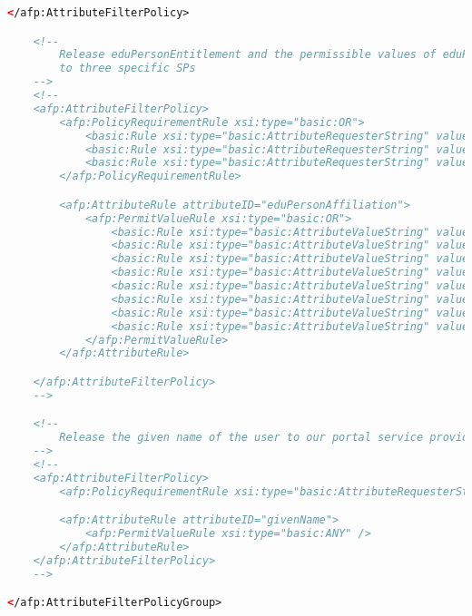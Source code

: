 \begin{lstlisting}[language=xml]
    </afp:AttributeFilterPolicy>

    <!--
        Release eduPersonEntitlement and the permissible values of eduPersonAffiliation
        to three specific SPs
    -->
    <!--
    <afp:AttributeFilterPolicy>
        <afp:PolicyRequirementRule xsi:type="basic:OR">
            <basic:Rule xsi:type="basic:AttributeRequesterString" value="urn:example.org:sp:Portal" />
            <basic:Rule xsi:type="basic:AttributeRequesterString" value="urn:example.org:sp:SIS" />
            <basic:Rule xsi:type="basic:AttributeRequesterString" value="urn:example.org:sp:LMS" />
        </afp:PolicyRequirementRule>

        <afp:AttributeRule attributeID="eduPersonAffiliation">
            <afp:PermitValueRule xsi:type="basic:OR">
                <basic:Rule xsi:type="basic:AttributeValueString" value="faculty" ignoreCase="true" />
                <basic:Rule xsi:type="basic:AttributeValueString" value="student" ignoreCase="true" />
                <basic:Rule xsi:type="basic:AttributeValueString" value="staff" ignoreCase="true" />
                <basic:Rule xsi:type="basic:AttributeValueString" value="alum" ignoreCase="true" />
                <basic:Rule xsi:type="basic:AttributeValueString" value="member" ignoreCase="true" />
                <basic:Rule xsi:type="basic:AttributeValueString" value="affiliate" ignoreCase="true" />
                <basic:Rule xsi:type="basic:AttributeValueString" value="employee" ignoreCase="true" />
                <basic:Rule xsi:type="basic:AttributeValueString" value="library-walk-in" ignoreCase="true" />
            </afp:PermitValueRule>
        </afp:AttributeRule>

    </afp:AttributeFilterPolicy>
    -->

    <!--
        Release the given name of the user to our portal service provider
    -->
    <!--
    <afp:AttributeFilterPolicy>
        <afp:PolicyRequirementRule xsi:type="basic:AttributeRequesterString" value="urn:example.org:sp:myPortal" />

        <afp:AttributeRule attributeID="givenName">
            <afp:PermitValueRule xsi:type="basic:ANY" />
        </afp:AttributeRule>
    </afp:AttributeFilterPolicy>
    -->

</afp:AttributeFilterPolicyGroup>
\end{lstlisting}

